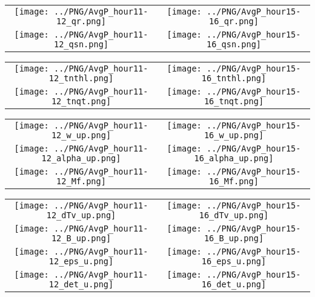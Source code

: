 \documentclass{article}
\begin{document}
\newpage

\begin{table}
  \begin{tabular}{cc}
     \texttt{[image: ../PNG/AvgP\_hour11-12\_qr.png]}   & \texttt{[image: ../PNG/AvgP\_hour15-16\_qr.png]}  \\
     \texttt{[image: ../PNG/AvgP\_hour11-12\_qsn.png]}  & \texttt{[image: ../PNG/AvgP\_hour15-16\_qsn.png]}
  \end{tabular}
\end{table}

\newpage

\begin{table}
  \begin{tabular}{cc}
     \texttt{[image: ../PNG/AvgP\_hour11-12\_tnthl.png]}  & \texttt{[image: ../PNG/AvgP\_hour15-16\_tnthl.png]} \\
     \texttt{[image: ../PNG/AvgP\_hour11-12\_tnqt.png]} & \texttt{[image: ../PNG/AvgP\_hour15-16\_tnqt.png]}
  \end{tabular}
\end{table}

\newpage

\begin{table}
  \begin{tabular}{cc}
     \texttt{[image: ../PNG/AvgP\_hour11-12\_w\_up.png]}     & \texttt{[image: ../PNG/AvgP\_hour15-16\_w\_up.png]}     \\
     \texttt{[image: ../PNG/AvgP\_hour11-12\_alpha\_up.png]} & \texttt{[image: ../PNG/AvgP\_hour15-16\_alpha\_up.png]} \\
     \texttt{[image: ../PNG/AvgP\_hour11-12\_Mf.png]}       & \texttt{[image: ../PNG/AvgP\_hour15-16\_Mf.png]}
  \end{tabular}
\end{table}

\newpage

\begin{table}
  \begin{tabular}{cc}
     \texttt{[image: ../PNG/AvgP\_hour11-12\_dTv\_up.png]} & \texttt{[image: ../PNG/AvgP\_hour15-16\_dTv\_up.png]} \\
     \texttt{[image: ../PNG/AvgP\_hour11-12\_B\_up.png]}   & \texttt{[image: ../PNG/AvgP\_hour15-16\_B\_up.png]}   \\
     \texttt{[image: ../PNG/AvgP\_hour11-12\_eps\_u.png]}  & \texttt{[image: ../PNG/AvgP\_hour15-16\_eps\_u.png]}  \\
     \texttt{[image: ../PNG/AvgP\_hour11-12\_det\_u.png]}  & \texttt{[image: ../PNG/AvgP\_hour15-16\_det\_u.png]}
  \end{tabular}
\end{table}
\end{document}
